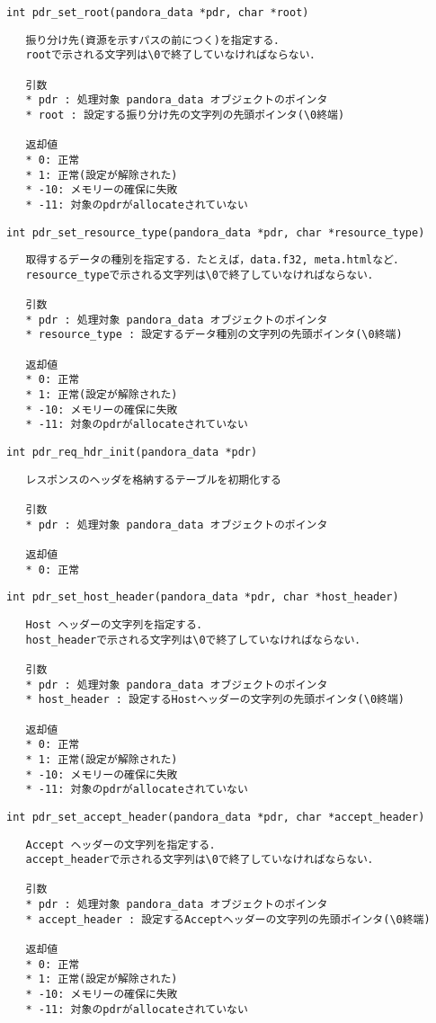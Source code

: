 {\large\verb|int pdr_set_root(pandora_data *pdr, char *root)|}
\begin{verbatim}
   振り分け先(資源を示すパスの前につく)を指定する．
   rootで示される文字列は\0で終了していなければならない．

   引数
   * pdr : 処理対象 pandora_data オブジェクトのポインタ
   * root : 設定する振り分け先の文字列の先頭ポインタ(\0終端)

   返却値
   * 0: 正常
   * 1: 正常(設定が解除された)
   * -10: メモリーの確保に失敗
   * -11: 対象のpdrがallocateされていない
\end{verbatim}
{\large\verb|int pdr_set_resource_type(pandora_data *pdr, char *resource_type)|}
\begin{verbatim}
   取得するデータの種別を指定する．たとえば，data.f32, meta.htmlなど．
   resource_typeで示される文字列は\0で終了していなければならない．

   引数
   * pdr : 処理対象 pandora_data オブジェクトのポインタ
   * resource_type : 設定するデータ種別の文字列の先頭ポインタ(\0終端)

   返却値
   * 0: 正常
   * 1: 正常(設定が解除された)
   * -10: メモリーの確保に失敗
   * -11: 対象のpdrがallocateされていない
\end{verbatim}
{\large\verb|int pdr_req_hdr_init(pandora_data *pdr)|}
\begin{verbatim}
   レスポンスのヘッダを格納するテーブルを初期化する

   引数
   * pdr : 処理対象 pandora_data オブジェクトのポインタ

   返却値
   * 0: 正常

\end{verbatim}
{\large\verb|int pdr_set_host_header(pandora_data *pdr, char *host_header)|}
\begin{verbatim}
   Host ヘッダーの文字列を指定する．
   host_headerで示される文字列は\0で終了していなければならない．

   引数
   * pdr : 処理対象 pandora_data オブジェクトのポインタ
   * host_header : 設定するHostヘッダーの文字列の先頭ポインタ(\0終端)

   返却値
   * 0: 正常
   * 1: 正常(設定が解除された)
   * -10: メモリーの確保に失敗
   * -11: 対象のpdrがallocateされていない
\end{verbatim}
{\large\verb|int pdr_set_accept_header(pandora_data *pdr, char *accept_header)|}
\begin{verbatim}
   Accept ヘッダーの文字列を指定する．
   accept_headerで示される文字列は\0で終了していなければならない．

   引数
   * pdr : 処理対象 pandora_data オブジェクトのポインタ
   * accept_header : 設定するAcceptヘッダーの文字列の先頭ポインタ(\0終端)

   返却値
   * 0: 正常
   * 1: 正常(設定が解除された)
   * -10: メモリーの確保に失敗
   * -11: 対象のpdrがallocateされていない
\end{verbatim}
